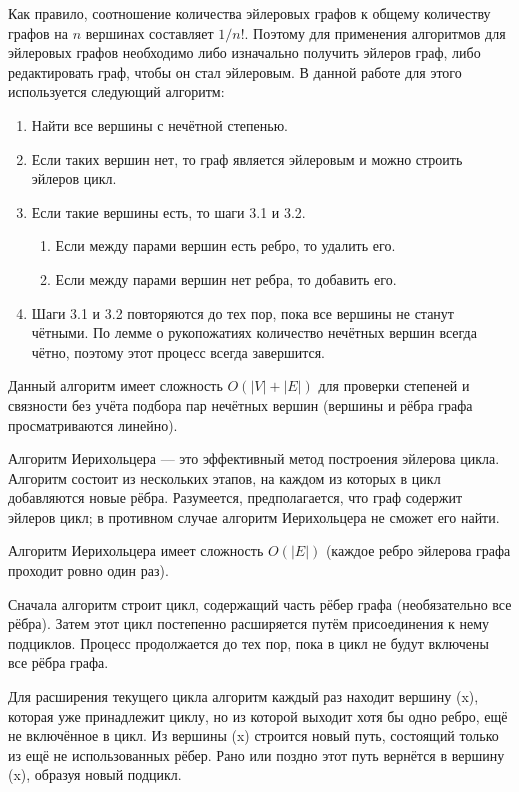 \documentclass[14pt,a4paper]{extarticle}
\begin{document}
Как правило, соотношение количества эйлеровых графов к общему количеству графов на \(n\) вершинах составляет \(1/n!\). Поэтому для применения алгоритмов для эйлеровых графов необходимо либо изначально получить эйлеров граф, либо редактировать граф, чтобы он стал эйлеровым. В данной работе для этого используется следующий алгоритм:

\begin{enumerate}
    \item Найти все вершины с нечётной степенью.
    \item Если таких вершин нет, то граф является эйлеровым и можно строить эйлеров цикл.
    \item Если такие вершины есть, то шаги 3.1 и 3.2.
    \begin{enumerate}
        \item Если между парами вершин есть ребро, то удалить его.
        \item Если между парами вершин нет ребра, то добавить его.
    \end{enumerate}
    \item Шаги 3.1 и 3.2 повторяются до тех пор, пока все вершины не станут чётными. По лемме о рукопожатиях количество нечётных вершин всегда чётно, поэтому этот процесс всегда завершится.
\end{enumerate}

Данный алгоритм имеет сложность \(O(|V|+|E|)\) для проверки степеней и связности без учёта подбора пар нечётных вершин (вершины и рёбра графа просматриваются линейно).

Алгоритм Иерихольцера\cite{hierholzer} --- это эффективный метод построения эйлерова цикла. Алгоритм состоит из нескольких этапов, на каждом из которых в цикл добавляются новые рёбра. Разумеется, предполагается, что граф содержит эйлеров цикл; в противном случае алгоритм Иерихольцера не сможет его найти.

Алгоритм Иерихольцера имеет сложность \(O(|E|)\) (каждое ребро эйлерова графа проходит ровно один раз).

Сначала алгоритм строит цикл, содержащий часть рёбер графа (необязательно все рёбра). Затем этот цикл постепенно расширяется путём присоединения к нему подциклов. Процесс продолжается до тех пор, пока в цикл не будут включены все рёбра графа.

Для расширения текущего цикла алгоритм каждый раз находит вершину (x), которая уже принадлежит циклу, но из которой выходит хотя бы одно ребро, ещё не включённое в цикл. Из вершины (x) строится новый путь, состоящий только из ещё не использованных рёбер. Рано или поздно этот путь вернётся в вершину (x), образуя новый подцикл.
\end{document}
